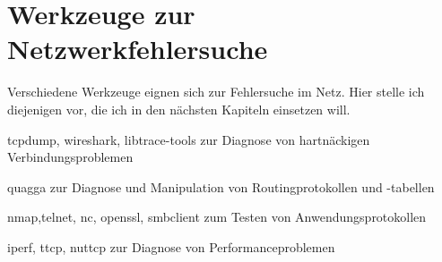 \chapter{Werkzeuge zur Netzwerkfehlersuche}
\label{cha:netz-werkzeuge}

\begin{abstractsec}
  Verschiedene Werkzeuge eignen sich zur Fehlersuche im Netz. Hier stelle ich
  diejenigen vor, die ich in den nächsten Kapiteln einsetzen will.
\end{abstractsec}

\begin{notes}
\item[tcpdump, wireshark, libtrace-tools] zur Diagnose von hartnäckigen
  Verbindungsproblemen
\item[quagga] zur Diagnose und Manipulation von Routingprotokollen und
  -tabellen
\item[nmap,telnet, nc, openssl, smbclient] zum Testen von Anwendungsprotokollen
\item[iperf, ttcp, nuttcp] zur Diagnose von Performanceproblemen
\end{notes}

